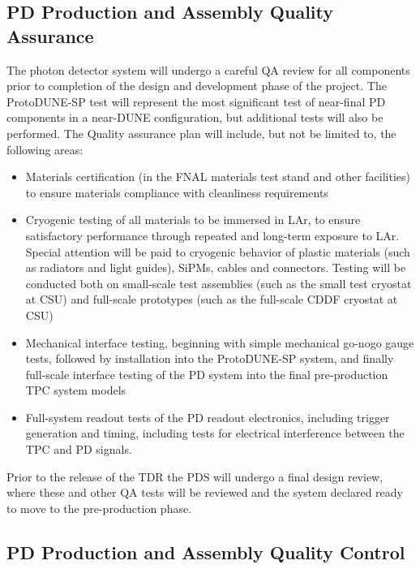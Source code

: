 \subsection{PD Production and Assembly Quality Assurance}
\label{sec:fdsp-pd-prodqa}

The photon detector system will undergo a careful QA review for all components prior to completion of the design and development phase of the project.  The ProtoDUNE-SP test will represent the most significant test of near-final PD components in a near-DUNE configuration, but additional tests will also be performed.  The Quality assurance plan will include, but not be limited to, the following areas:

\begin{itemize}
\item Materials certification (in the FNAL materials test stand and other facilities) to ensure materials compliance with cleanliness requirements
\item Cryogenic testing of all materials to be immersed in LAr, to ensure satisfactory performance through repeated and long-term exposure to LAr.  Special attention will be paid to cryogenic behavior of plastic materials (such as radiators and light guides), SiPMs, cables and connectors.  Testing will be conducted both on small-scale test assemblies (such as the small test cryostat at CSU) and full-scale prototypes (such as the full-scale CDDF cryostat at CSU) 
\item Mechanical interface testing, beginning with simple mechanical go-nogo gauge tests, followed by installation into the ProtoDUNE-SP system, and finally full-scale interface testing of the PD system into the final pre-production TPC system models
\item Full-system readout tests of the PD readout electronics, including trigger generation and timing, including tests for electrical interference between the TPC and PD signals.
\end{itemize}

Prior to the release of the TDR the PDS will undergo a final design review, where these and other QA tests will be reviewed and the system declared ready to move to the pre-production phase.


\subsection{PD Production and Assembly Quality Control}
\label{sec:fdsp-pd-prodqc}

